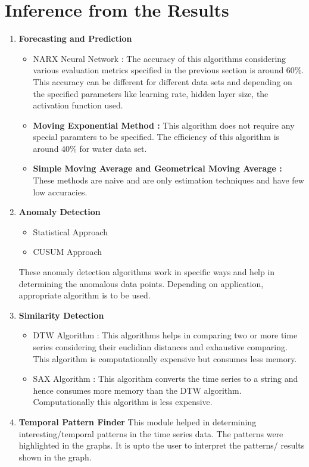 \documentclass[12pt,a4paper]{report}
\begin{document}
\section{Inference from the Results}
\begin{enumerate}

\item \textbf{Forecasting and Prediction}
\begin{itemize}
\item  NARX Neural Network : The accuracy of this algorithms considering various evaluation metrics specified in the previous section is around 60\%. This accuracy can be different for different data sets and depending on the specified parameters like learning rate, hidden layer size, the activation function used.
\item \textbf{ Moving Exponential Method : } This algorithm does not require any special paramters to be specified. The efficiency of this algorithm is around 40\% for water data set.
\item \textbf{Simple Moving Average and Geometrical Moving Average : } These methods are naive and are only estimation techniques and have few low accuracies.
\end{itemize}

\item \textbf{Anomaly Detection }

\begin{itemize}
\item  Statistical Approach 
\item  CUSUM Approach 
\end{itemize}
These anomaly detection algorithms work in specific ways and help in determining the anomalous data points. Depending on application, appropriate algorithm is to be used.
\item \textbf{Similarity Detection }
\begin{itemize}
\item  DTW Algorithm : This algorithms helps in comparing two or more time series considering their euclidian distances and exhaustive comparing. This algorithm is computationally expensive but consumes less memory.
\item  SAX Algorithm : This algorithm converts the time series to a string and hence consumes more memory than the DTW algorithm. Computationally this algorithm is less expensive.
\end{itemize}

\item \textbf{Temporal Pattern Finder}
This module helped in determining interesting/temporal patterns in the time series data. The patterns were highlighted in the graphs. It is upto the user to interpret the patterns/ results shown in the graph.

\end{enumerate}
\end{document}
